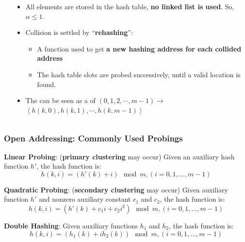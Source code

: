 \documentclass[UTF8,11pt]{beamer}
\begin{document}
\begin{frame}
\begin{columns}
\begin{column}{0.2\linewidth}
	\end{column}
	\begin{column}{0.85\linewidth}
		\begin{itemize}
			\item All elements are stored in the hash table, \textbf{no linked list is used}. So, $\alpha\le 1$.
		
			\pause
			\item Collision is settled by ``\textbf{\color{red}rehashing}'':
			\begin{itemize}
				\pause\item 	A function used to get \textbf{a new hashing address for each collided address}
				\pause\item The hash table slots are probed successively, until a valid location is found.
			\end{itemize} 
		
			\pause
			\item The \textbf{} can be seen as a \textbf{} of $(0,1,2,\cdots, m-1)$$\rightarrow$$\left\langle h(k,0), h(k,1),\cdots, h(k,m-1)\right\rangle $
			
		\end{itemize}
	\end{column}
\end{columns}
\end{frame}


\begin{frame}
\frametitle{Open Addressing: Commonly Used Probings}

\begin{block}{\textbf{\color{red}Linear Probing}: (\textbf{\color{blue}primary clustering} may occur)}
Given an auxiliary hash function $h'$, the hash function is: 
	\[h(k,i) = (h'(k)+i)\mod {m},  (i=0,1,...,m-1)\]
\end{block}
\pause
\begin{block}{\textbf{\color{red}Quadratic Probing}: (\textbf{\color{blue}secondary clustering} may occur)}
Given auxiliary function $h'$ and nonzero auxiliary constant $c_1$ and $c_2$, the hash function is: 
	\[h(k,i) = (h'(k)+c_1i+ c_2i^2) \mod m,   (i=0,1,...,m-1)\]
\end{block}
\pause
\begin{block}{\textbf{\color{red}Double Hashing}:}
Given auxiliary functions $h_1$ and $h_2$, the hash function is: 
\[h(k,i) = (h_1(k)+ ih_2(k)) \mod m, (i=0,1,...,m-1)\]
\end{block}	
\end{frame}
\end{document}
